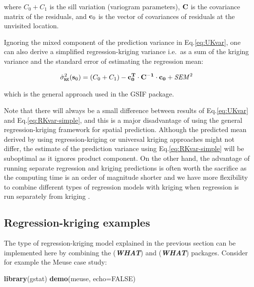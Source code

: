 \documentclass[11pt]{krantz}
\newenvironment{Shaded}{\begin{snugshade}}{\end{snugshade}}
\newcommand{\DataTypeTok}[1]{\textcolor[rgb]{0.27,0.27,0.27}{#1}}
\newcommand{\KeywordTok}[1]{\textcolor[rgb]{0.27,0.27,0.27}{\textbf{#1}}}
\newcommand{\NormalTok}[1]{#1}
\newcommand{\OtherTok}[1]{\textcolor[rgb]{0.37,0.37,0.37}{#1}}
\theoremstyle{definition}
\theoremstyle{definition}
\theoremstyle{definition}
\theoremstyle{remark}
\begin{document}
where \(C_0 + C_1\) is the sill variation (variogram parameters),
\(\bf{C}\) is the covariance matrix of the residuals, and \({\bf{c}}_0\)
is the vector of covariances of residuals at the unvisited location.

Ignoring the mixed component of the prediction variance in
Eq.\eqref{eq:UKvar}, one can also derive a simplified regression-kriging
variance i.e.~as a sum of the kriging variance and the standard error of
estimating the regression mean:

\begin{equation}
\hat \sigma _{\tt{RK}}^2 ({\bf{s}}_0) = (C_0  + C_1 ) -
{\bf{c}}_{\bf{0}}^{\bf{T}}  \cdot {\bf{C}}^{ - {\bf{1}}}  \cdot
{\bf{c}}_{\bf{0}} + {\it{SEM}}^2
\label{eq:RKvar-simple}
\end{equation}

which is the general approach used in the GSIF package.

Note that there will always be a small difference between results of
Eq.\eqref{eq:UKvar} and Eq.\eqref{eq:RKvar-simple}, and this is a major
disadvantage of using the general regression-kriging framework for
spatial prediction. Although the predicted mean derived by using
regression-kriging or universal kriging approaches might not differ, the
estimate of the prediction variance using Eq.\eqref{eq:RKvar-simple} will
be suboptimal as it ignores product component. On the other hand, the
advantage of running separate regression and kriging predictions is
often worth the sacrifice as the computing time is an order of magnitude
shorter and we have more flexibility to combine different types of
regression models with kriging when regression is run separately from
kriging \citep{hengl2007regression}.

\hypertarget{regression-kriging-examples}{%
\subsection{Regression-kriging
examples}\label{regression-kriging-examples}}

The type of regression-kriging model explained in the previous section
can be implemented here by combining the (\textbf{\emph{WHAT}}) and
(\textbf{\emph{WHAT}}) packages. Consider for example the Meuse case
study:

\begin{Shaded}
\begin{Highlighting}[]
\KeywordTok{library}\NormalTok{(gstat)}
\KeywordTok{demo}\NormalTok{(meuse, }\DataTypeTok{echo=}\OtherTok{FALSE}\NormalTok{)}
\end{Highlighting}
\end{Shaded}
\end{document}
